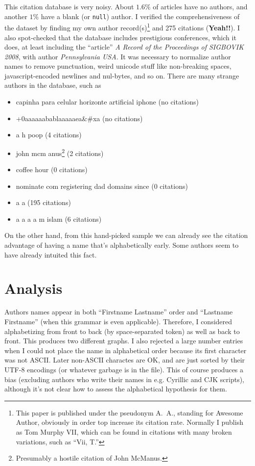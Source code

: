 \documentclass[twocolumn]{article}
\begin{document}
This citation database is very noisy. About $1.6\%$ of articles have
no authors, and another $1\%$ have a blank (or {\tt null}) author. I
verified the comprehensiveness of the dataset by finding my own author
record(s)\footnote{This paper is published under the pseudonym A.~A.,
  standing for Awesome Author, obviously in order top increase its
  citation rate. Normally I publish as Tom Murphy VII, which can be
  found in citations with many broken variations, such as ``Vii, T.''}
and 275 citations ({\bf Yeah!!}). I also spot-checked that the database
includes prestigious conferences, which it does, at least including
the ``article'' {\em A Record of the Proceedings of SIGBOVIK 2008},
with author {\em Pennsylvania USA}. It was necessary to normalize
author names to remove punctuation, weird unicode stuff like non-breaking
spaces, javascript-encoded newlines and nul-bytes, and so on. There
are many strange authors in the database, such as
\begin{itemize}
\item capinha para celular horizonte artificial iphone \quad(no citations)
\item +0aaaaaabablaaaaaea\&\#xa \quad(no citations)
\item a h poop \quad(4 citations)
\item john mcm anus\footnote{Presumably a hostile citation of John McManus.} \quad(2 citations)
\item coffee hour \quad(0 citations)
\item nominate com registering dad domains since \quad(0 citations)
\item a a \quad(195 citations)
\item a a a a m islam \quad(6 citations)
\end{itemize}

On the other hand, from this hand-picked sample we can already see the
citation advantage of having a name that's alphabetically early. Some
authors seem to have already intuited this fact.

\section{Analysis}

Authors names appear in both ``Firstname Lastname'' order and
``Lastname Firstname'' (when this grammar is even applicable).
Therefore, I considered alphabetizing from front to back (by
space-separated token) as well as back to front. This produces two
different graphs. I also rejected a large number entries when I could
not place the name in alphabetical order because its first character
was not ASCII. Later non-ASCII charactes are OK, and are just sorted
by their UTF-8 encodings (or whatever garbage is in the file). This of
course produces a bias (excluding authors who write their names in
e.g. Cyrillic and CJK scripts), although it's not clear how to assess
the alphabetical hypothesis for them.
\end{document}
